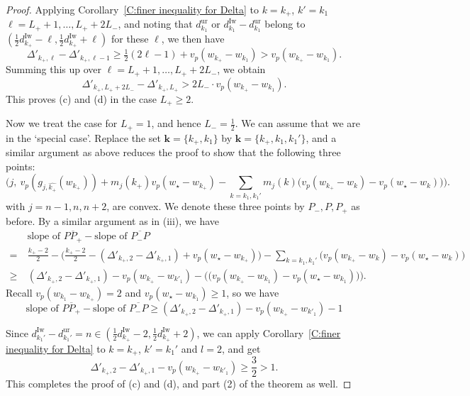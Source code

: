 \documentclass[12pt]{amsart}
\theoremstyle{definition}
\numberwithin{equation}{subsection}
\def\bfk{\mathbf{k}}
\newcommand{\Iw}{\mathrm{Iw}}
\newcommand{\ur}{\mathrm{ur}}
\begin{document}
\begin{proof}
Applying Corollary~\ref{C:finer inequality for Delta} to $k = k_+$, $k'=k_1$ $\ell = L_++1, \dots, L_++2L_-$, and noting that $d_{k_1}^\ur$ or $d_{k_1}^\Iw-d_{k_1}^\ur $ belong to $(\frac 12d_{k_+}^\Iw - \ell, \frac 12d_{k_+}^\Iw+\ell)$ for these $\ell$, we then have
$$
\Delta'_{k_+, \ell} - \Delta'_{k_+, \ell-1} \geq \tfrac 12(2\ell-1) + v_p(w_{k_{+}} - w_{k_1})>v_p(w_{k_{+}} - w_{k_1}).
$$
Summing this up over $\ell = L_++1, \dots, L_++2L_-$, we obtain
$$
\Delta'_{k_+, L_++2L_-} - \Delta'_{k_+, L_+} > 2L_- \cdot v_p(w_{k_{+}} - w_{k_1}).
$$
This proves (c) and (d) in the case $L_+\geq 2$.


Now we treat the case for $L_+=1$, and hence $L_-=\frac 12$. We can assume that we are in the `special case'. Replace the set $\bfk=\{k_+,k_1 \}$ by $\bfk=\{k_+,k_1,k_1' \}$, and a similar argument as above reduces the proof to show that the following three points:
\begin{equation}
\Big( j,\ v_p(g_{j, \hat{ k_+}}(w_{k_+})) + m_j(k_+)v_p(w_\star-w_{k_+}) - \sum _{k=k_1,k_1'}m_j(k)\big(v_p(w_{k_+}-w_{k})- v_p(w_\star-w_{k})  \big)\Big).
\end{equation}
with $j=n-1,n,n+2$, are convex. We denote these three points by $P_-,P,P_+$ as before. By a similar argument as in (iii), we have 
\begin{align*}
&\textrm{slope of }\overline{PP_+}  - \textrm{slope of }\overline{P_-P}
\\
=\ & \frac{k_+-2}2 - \Big( \frac{k_+-2}2  -(\Delta'_{k_+, 2} - \Delta'_{k_+, 1}) +v_p(w_\star-w_{k_+})\Big) -
\sum_{k=k_1,k_1'} \big(v_p(w_{k_+}-w_{k})- v_p(w_\star-w_{k})  \big)
\\
\geq \ &(\Delta'_{k_+, 2} - \Delta'_{k_+, 1})- v_p(w_{k_+}-w_{k'_1})-\Big(\big(v_p(w_{k_+}-w_{k_1})- v_p(w_\star-w_{k_1})  \big)\Big).
\end{align*}
Recall $v_p(w_{k_1}-w_{k_+})=2$ and $v_p(w_\star-w_{k_1})\geq 1$, so we have 
\[
\textrm{slope of }\overline{PP_+}  - \textrm{slope of }\overline{P_-P}\geq (\Delta'_{k_+, 2} - \Delta'_{k_+, 1}) - v_p(w_{k_+}-w_{k'_1})-1
\]

Since $d_{k_1'}^\Iw-d_{k_1'}^\ur=n\in (\frac 12 d_{k_+}^\Iw-2,\frac 12 d_{k_+}^\Iw+2)$, we can apply Corollary~\ref{C:finer inequality for Delta} to $k=k_+$, $k'=k_1'$ and $l=2$, and get 
\[
\Delta'_{k_+, 2} - \Delta'_{k_+, 1}- v_p(w_{k_+}-w_{k'_1})\geq \frac 32>1.
\]
This completes the proof of (c) and (d), and part (2) of the theorem as well.




\end{proof}
\end{document}
